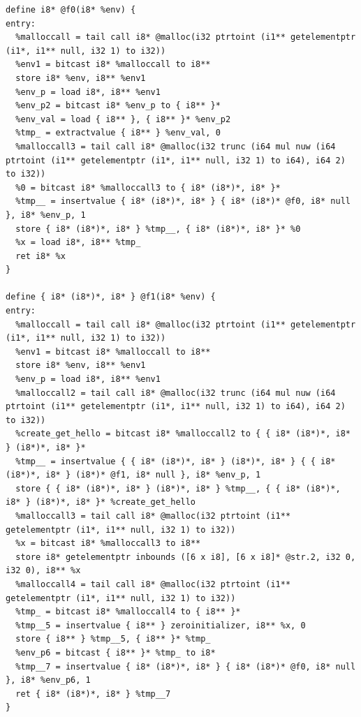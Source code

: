 \documentclass[12pt]{article}
\begin{document}
\begin{mdframed}[hidealllines=true,backgroundcolor=green!10]
\begin{lstlisting}
define i8* @f0(i8* %env) {
entry:
  %malloccall = tail call i8* @malloc(i32 ptrtoint (i1** getelementptr (i1*, i1** null, i32 1) to i32))
  %env1 = bitcast i8* %malloccall to i8**
  store i8* %env, i8** %env1
  %env_p = load i8*, i8** %env1
  %env_p2 = bitcast i8* %env_p to { i8** }*
  %env_val = load { i8** }, { i8** }* %env_p2
  %tmp_ = extractvalue { i8** } %env_val, 0
  %malloccall3 = tail call i8* @malloc(i32 trunc (i64 mul nuw (i64 ptrtoint (i1** getelementptr (i1*, i1** null, i32 1) to i64), i64 2) to i32))
  %0 = bitcast i8* %malloccall3 to { i8* (i8*)*, i8* }*
  %tmp__ = insertvalue { i8* (i8*)*, i8* } { i8* (i8*)* @f0, i8* null }, i8* %env_p, 1
  store { i8* (i8*)*, i8* } %tmp__, { i8* (i8*)*, i8* }* %0
  %x = load i8*, i8** %tmp_
  ret i8* %x
}

define { i8* (i8*)*, i8* } @f1(i8* %env) {
entry:
  %malloccall = tail call i8* @malloc(i32 ptrtoint (i1** getelementptr (i1*, i1** null, i32 1) to i32))
  %env1 = bitcast i8* %malloccall to i8**
  store i8* %env, i8** %env1
  %env_p = load i8*, i8** %env1
  %malloccall2 = tail call i8* @malloc(i32 trunc (i64 mul nuw (i64 ptrtoint (i1** getelementptr (i1*, i1** null, i32 1) to i64), i64 2) to i32))
  %create_get_hello = bitcast i8* %malloccall2 to { { i8* (i8*)*, i8* } (i8*)*, i8* }*
  %tmp__ = insertvalue { { i8* (i8*)*, i8* } (i8*)*, i8* } { { i8* (i8*)*, i8* } (i8*)* @f1, i8* null }, i8* %env_p, 1
  store { { i8* (i8*)*, i8* } (i8*)*, i8* } %tmp__, { { i8* (i8*)*, i8* } (i8*)*, i8* }* %create_get_hello
  %malloccall3 = tail call i8* @malloc(i32 ptrtoint (i1** getelementptr (i1*, i1** null, i32 1) to i32))
  %x = bitcast i8* %malloccall3 to i8**
  store i8* getelementptr inbounds ([6 x i8], [6 x i8]* @str.2, i32 0, i32 0), i8** %x
  %malloccall4 = tail call i8* @malloc(i32 ptrtoint (i1** getelementptr (i1*, i1** null, i32 1) to i32))
  %tmp_ = bitcast i8* %malloccall4 to { i8** }*
  %tmp__5 = insertvalue { i8** } zeroinitializer, i8** %x, 0
  store { i8** } %tmp__5, { i8** }* %tmp_
  %env_p6 = bitcast { i8** }* %tmp_ to i8*
  %tmp__7 = insertvalue { i8* (i8*)*, i8* } { i8* (i8*)* @f0, i8* null }, i8* %env_p6, 1
  ret { i8* (i8*)*, i8* } %tmp__7
}


\end{lstlisting}
\end{mdframed}
\end{document}
